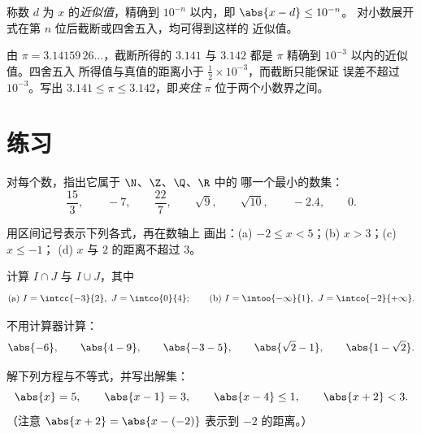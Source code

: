 \begin{definition}[给定精度的近似值]\label{def:g10:numbers:approx}
称数 $d$ 为 $x$ 的\emph{近似值}，精确到
$10^{-n}$ 以内，即 $\abs{x - d} \leq 10^{-n}$。
对小数展开式在第 $n$ 位后截断或四舍五入，均可得到这样的
近似值。
\end{definition}

\begin{example}
由 $\pi = 3.14159\,26\dots$，截断所得的 $3.141$ 与
$3.142$ 都是 $\pi$ 精确到 $10^{-3}$ 以内的近似值。四舍五入
所得值与真值的距离小于 $\frac12 \times 10^{-3}$，而截断只能保证
误差不超过 $10^{-3}$。写出 $3.141 \leq \pi \leq 3.142$，即\emph{夹住}
$\pi$ 位于两个小数界之间。
\end{example}

\section{练习}

\begin{exercise}[$\star$]\label{exo:g10:numbers:1}
对每个数，指出它属于 $\N$、$\Z$、$\Q$、$\R$ 中的
哪一个最小的数集：
\[
\frac{15}{3}, \qquad -7, \qquad \frac{22}{7}, \qquad \sqrt{9}, \qquad
\sqrt{10}, \qquad -2.4, \qquad 0 .
\]
\end{exercise}

\begin{exercise}[$\star$]\label{exo:g10:numbers:2}
用区间记号表示下列各式，再在数轴上
画出：(a) $-2 \leq x < 5$；(b) $x > 3$；(c) $x \leq -1$；
(d) $x$ 与 $2$ 的距离不超过 $3$。
\end{exercise}

\begin{exercise}[$\star$]\label{exo:g10:numbers:3}
计算 $I \cap J$ 与 $I \cup J$，其中
\[
\text{(a) } I = \intcc{-3}{2},\ J = \intco{0}{4};
\qquad
\text{(b) } I = \intoo{-\infty}{1},\ J = \intco{-2}{+\infty}.
\]
\end{exercise}

\begin{exercise}[$\star$]\label{exo:g10:numbers:4}
不用计算器计算：
\[
\abs{-6}, \qquad \abs{4 - 9}, \qquad \abs{-3 - 5}, \qquad
\abs{\sqrt 2 - 1}, \qquad \abs{1 - \sqrt 2}.
\]
\end{exercise}

\begin{exercise}[$\star$]\label{exo:g10:numbers:5}
解下列方程与不等式，并写出解集：
\[
\abs{x} = 5, \qquad \abs{x - 1} = 3, \qquad \abs{x - 4} \leq 1, \qquad
\abs{x + 2} < 3 .
\]
（注意 $\abs{x+2} = \abs{x - (-2)}$ 表示到 $-2$ 的距离。）
\end{exercise}

